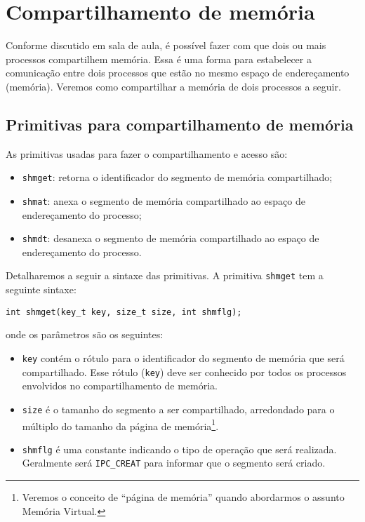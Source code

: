 \chapter{Compartilhamento de memória}

Conforme discutido em sala de aula, é possível fazer com que dois ou mais processos compartilhem memória. Essa é uma forma para estabelecer a comunicação entre dois processos que estão no mesmo espaço de endereçamento (memória). Veremos como compartilhar a memória de dois processos a seguir.

\section{Primitivas para compartilhamento de memória}
As primitivas usadas para fazer o compartilhamento e acesso são:
\begin{itemize}
\setlength{\itemsep}{1pt}\setlength{\parskip}{0pt}  \setlength{\parsep}{0pt}
\item \texttt{shmget}: retorna o identificador do segmento de memória compartilhado;
\item \texttt{shmat}: anexa o segmento de memória compartilhado ao espaço de endereçamento do processo;
\item \texttt{shmdt}: desanexa o segmento de memória compartilhado ao espaço de endereçamento do processo.
\end{itemize}

 Detalharemos a seguir a sintaxe das primitivas. A primitiva \texttt{shmget} tem a seguinte sintaxe:

\begin{lstlisting}[style=MyCStyle, frame=none, numbers=none]
    int shmget(key_t key, size_t size, int shmflg);
\end{lstlisting}
 
onde os parâmetros são os seguintes: 
\begin{itemize}
    \item \texttt{key} contém o rótulo para o identificador do segmento de memória que será compartilhado. Esse rótulo (\texttt{key}) deve ser conhecido por todos os processos envolvidos no compartilhamento de memória.
    \item \texttt{size} é o tamanho do segmento a ser compartilhado, arredondado para o múltiplo do tamanho da página de memória\footnote{Veremos o conceito de \enquote{página de memória} quando abordarmos o assunto Memória Virtual.}.
    \item \texttt{shmflg} é uma constante indicando o tipo de operação que será realizada.  Geralmente será \texttt{IPC\_CREAT} para informar que o segmento será criado.
\end{itemize}
     
